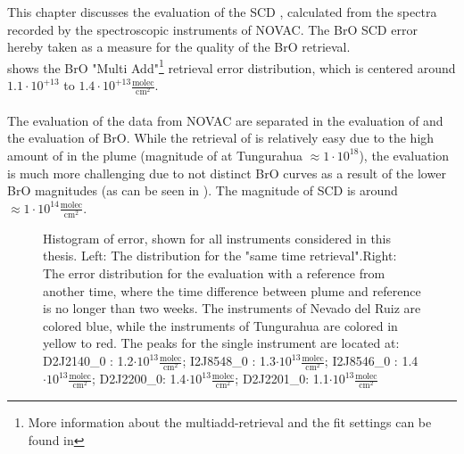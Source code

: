 This chapter discusses the evaluation of the  SCD , calculated from the spectra recorded by the spectroscopic instruments of NOVAC. The BrO SCD error hereby taken as a measure for the quality of the BrO retrieval.\\
 shows the BrO "Multi Add"\footnote{More information about the multiadd-retrieval and the fit settings can be found in } retrieval error distribution, which is centered around $1.1\cdot10^{+13}$ to $1.4\cdot 10^{+13}\frac{\text{molec}}{\text{cm}^2}$. \\
\\
The evaluation of the data from NOVAC are separated in the evaluation of  and the evaluation of BrO. While the retrieval of  is relatively easy due to the high amount of  in the plume (magnitude of  at Tungurahua $\approx 1\cdot 10^{18}$), the  evaluation is much more challenging due to not distinct BrO curves as a result of the lower BrO magnitudes (as can be seen in ). The magnitude of  SCD is around $\approx 1\cdot 10^{14}\frac{\text{molec}}{\text{cm}^2}$. \\
%
\begin{figure}
    \caption[Histogram of  error, shown for all instruments considered in this thesis.]{Histogram of  error, shown for all instruments considered in this thesis. Left: The  distribution for the "same time retrieval".Right: The  error distribution for the evaluation with a reference from another time, where the time difference between plume and reference is no longer than two weeks. The instruments of Nevado del Ruiz are colored blue, while the instruments of Tungurahua are colored in yellow to red.
        The peaks for the single instrument are located at: D2J2140\_0 : 1.2$\cdot 10^{13}\frac{\text{molec}}{\text{cm}^2}$; I2J8548\_0 : 1.3$\cdot 10^{13}\frac{\text{molec}}{\text{cm}^2}$;
        I2J8546\_0 : 1.4$\cdot 10^{13}\frac{\text{molec}}{\text{cm}^2}$;
        D2J2200\_0: 1.4$\cdot 10^{13}\frac{\text{molec}}{\text{cm}^2}$;
        D2J2201\_0: 1.1$\cdot 10^{13}\frac{\text{molec}}{\text{cm}^2}$}
    \label{fig:allbroerrordistribution}
\end{figure}

